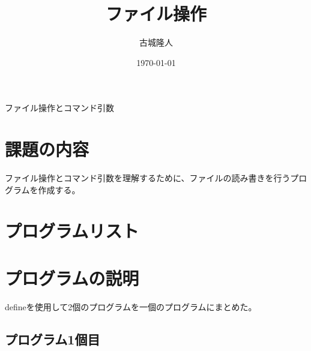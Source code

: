 \documentclass[dvipdfmx]{jsarticle}
\begin{document}
\title{ファイル操作}
\author{古城隆人}
\date{\today}
\maketitle


\newpage
\begin{center}
  \begin{center}
    \Huge ファイル操作とコマンド引数
  \end{center}
\end{center}


\section{課題の内容}
ファイル操作とコマンド引数を理解するために、ファイルの読み書きを行うプログラムを作成する。
\section{プログラムリスト}


\section{プログラムの説明}
defineを使用して2個のプログラムを一個のプログラムにまとめた。
\subsection{プログラム1個目}
\end{document}
